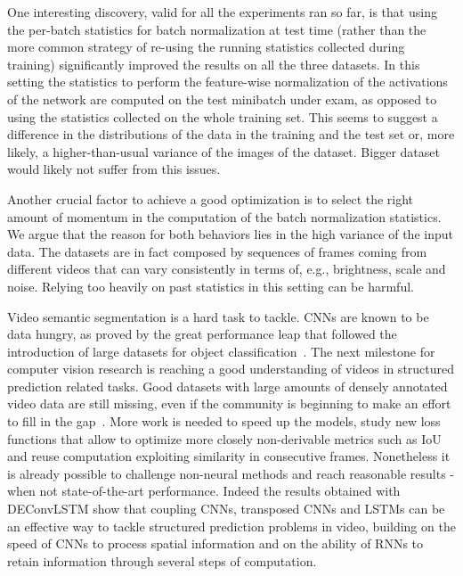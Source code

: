 One interesting discovery, valid for all the experiments ran so far, is that
using the per-batch statistics for batch normalization at test time (rather
than the more common strategy of re-using the running statistics collected
during training) significantly improved the results on all the three datasets.
In this setting the statistics to perform the feature-wise normalization of the
activations of the network are computed on the test minibatch under exam,
as opposed to using the statistics collected on the whole training set. This
seems to suggest a difference in the distributions of the data in the training
and the test set or, more likely, a higher-than-usual variance of the images
of the dataset. Bigger dataset would likely not suffer from this issues.

Another crucial factor to achieve a good optimization is to select the right
amount of momentum in the computation of the batch normalization statistics. We
argue that the reason for both behaviors lies in the high variance of the input
data. The datasets are in fact composed by sequences of frames coming from
different videos that can vary consistently in terms of, e.g., brightness,
scale and noise. Relying too heavily on past statistics in this setting can be
harmful.

Video semantic segmentation is a hard task to tackle. CNNs are known to be
data hungry, as proved by the great performance leap that followed the
introduction of large datasets for object classification~\citep{ILSVRCarxiv14}.
The next milestone for computer vision research is reaching a good
understanding of videos in structured prediction related tasks. Good datasets
with large amounts of densely annotated video data are still missing, even if
the community is beginning to make an effort to fill in the gap~\citep[%
see~e.g.,~][]{Perazzi2016,lin2014microsoft}. More work is needed to speed up
the models, study new loss functions that allow to optimize more closely
non-derivable metrics such as IoU and reuse computation exploiting similarity
in consecutive frames. Nonetheless it is already possible to challenge
non-neural methods and reach reasonable results - when not state-of-the-art
performance.  Indeed the results obtained with DEConvLSTM show that coupling
CNNs, transposed CNNs and LSTMs can be an effective way to tackle structured
prediction problems in video, building on the speed of CNNs to process spatial
information and on the ability of RNNs to retain information through several
steps of computation.


